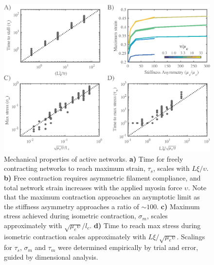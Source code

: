 \begin{figure}[h!]
	\centering
	\includegraphics[width=\hsize]{active/figures/FigS3}
	\caption{\label{fig:active_supp}  Mechanical properties of active networks.  \textbf{a)}  Time for freely contracting networks to reach maximum strain, $\tau_s$, scales with $L\xi/\upsilon$.  \textbf{b)} Free contraction requires asymmetric filament compliance, and total network strain increases with the applied myosin force $\upsilon$. Note that the maximum contraction approaches an asymptotic limit as the stiffness asymmetry approaches a ratio of $\sim 100$.   \textbf{c)}  Maximum stress achieved during isometric contraction, $\sigma_m$, scales approximately with $\sqrt{\mu_e\upsilon}/l_c$.  \textbf{d)} Time to reach max stress during isometric contraction scales approximately with $L\xi/\sqrt{\mu_e\upsilon}$. Scalings for $\tau_s$, $\sigma_m$ and $\tau_m$ were determined empirically by trial and error, guided by dimensional analysis. }
\end{figure}

